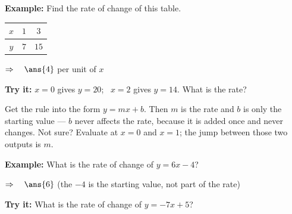 \documentclass[12pt]{article}
\begin{document}
\begin{examplebox}
\textbf{Example:} \quad Find the rate of change of this table.
\par\smallskip
\begin{center}
\begin{tabular}{|c|c|c|}\hline
$x$ & $1$ & $3$ \\ \hline
$y$ & $7$ & $15$ \\ \hline
\end{tabular}
\end{center}

$\Rightarrow\quad \ans{4}$ per unit of $x$
\end{examplebox}

\begin{tryitbox}
\textbf{Try it:} \quad $x = 0$ gives $y = 20$; \ $x = 2$ gives $y = 14$. What
is the rate?\\[2pt]
\end{tryitbox}


\begin{formulabox}
Get the rule into the form $y = mx + b$. Then $m$ is the rate and $b$ is only
the starting value --- $b$ never affects the rate, because it is added once and
never changes. Not sure? Evaluate at $x = 0$ and $x = 1$; the jump between
those two outputs is $m$.
\end{formulabox}

\begin{examplebox}
\textbf{Example:} \quad What is the rate of change of $y = 6x - 4$?

$\Rightarrow\quad \ans{6}$ \quad (the $-4$ is the starting value, not part of
the rate)
\end{examplebox}

\begin{tryitbox}
\textbf{Try it:} \quad What is the rate of change of $y = -7x + 5$?\\[2pt]
\end{tryitbox}
\end{document}
